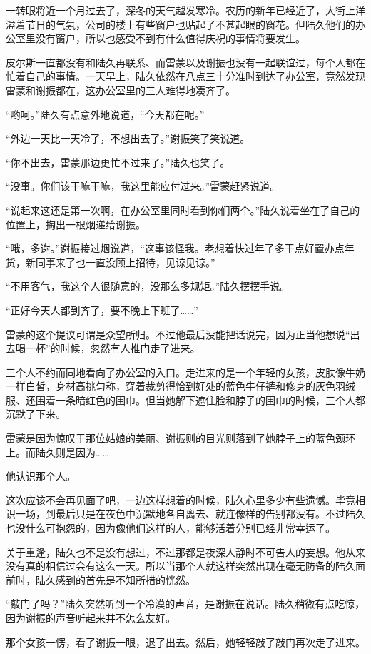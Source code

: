 一转眼将近一个月过去了，深冬的天气越发寒冷。农历的新年已经近了，大街上洋溢着节日的气氛，公司的楼上有些窗户也贴起了不甚起眼的窗花。但陆久他们的办公室里没有窗户，所以也感受不到有什么值得庆祝的事情将要发生。

皮尔斯一直都没有和陆久再联系、而雷蒙以及谢振也没有一起联谊过，每个人都在忙着自己的事情。一天早上，陆久依然在八点三十分准时到达了办公室，竟然发现雷蒙和谢振都在，这办公室里的三人难得地凑齐了。

“哟呵。”陆久有点意外地说道，“今天都在呢。”

“外边一天比一天冷了，不想出去了。”谢振笑了笑说道。

“你不出去，雷蒙那边更忙不过来了。”陆久也笑了。

“没事。你们该干嘛干嘛，我这里能应付过来。”雷蒙赶紧说道。

“说起来这还是第一次啊，在办公室里同时看到你们两个。”陆久说着坐在了自己的位置上，掏出一根烟递给谢振。

“哦，多谢。”谢振接过烟说道，“这事该怪我。老想着快过年了多干点好置办点年货，新同事来了也一直没顾上招待，见谅见谅。”

“不用客气，我这个人很随意的，没那么多规矩。”陆久摆摆手说。

“正好今天人都到齐了，要不晚上下班了……”

雷蒙的这个提议可谓是众望所归。不过他最后没能把话说完，因为正当他想说“出去喝一杯”的时候，忽然有人推门走了进来。

三个人不约而同地看向了办公室的入口。走进来的是一个年轻的女孩，皮肤像牛奶一样白皙，身材高挑匀称，穿着裁剪得恰到好处的蓝色牛仔裤和修身的灰色羽绒服、还围着一条暗红色的围巾。但当她解下遮住脸和脖子的围巾的时候，三个人都沉默了下来。

雷蒙是因为惊叹于那位姑娘的美丽、谢振则的目光则落到了她脖子上的蓝色颈环上。而陆久则是因为……

他认识那个人。

这次应该不会再见面了吧，一边这样想着的时候，陆久心里多少有些遗憾。毕竟相识一场，到最后只是在夜色中沉默地各自离去、就连像样的告别都没有。不过陆久也没什么可抱怨的，因为像他们这样的人，能够活着分别已经非常幸运了。

关于重逢，陆久也不是没有想过，不过那都是夜深人静时不可告人的妄想。他从来没有真的相信过会有这么一天。所以当那个人就这样突然出现在毫无防备的陆久面前时，陆久感到的首先是不知所措的恍然。

“敲门了吗？”陆久突然听到一个冷漠的声音，是谢振在说话。陆久稍微有点吃惊，因为谢振的声音听起来并不怎么友好。

那个女孩一愣，看了谢振一眼，退了出去。然后，她轻轻敲了敲门再次走了进来。

